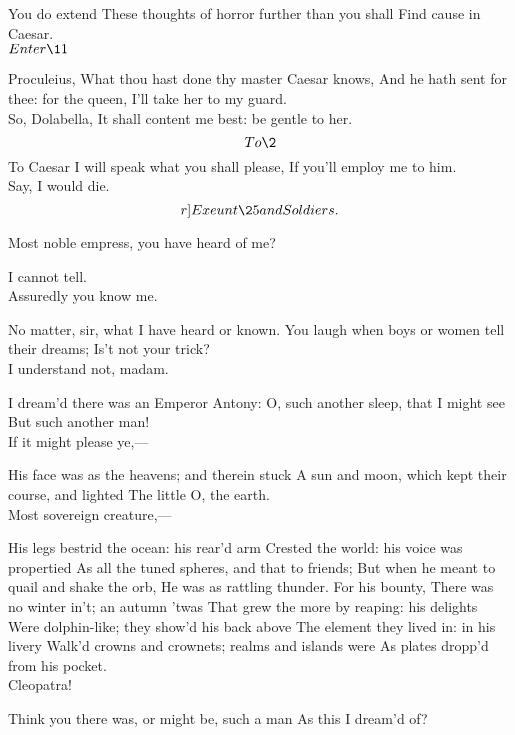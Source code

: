 \documentclass{book}
\begin{document}
	You do extend
	These thoughts of horror further than you shall
	Find cause in Caesar. \\

	\(Enter \11\)

	Proculeius,
	What thou hast done thy master Caesar knows,
	And he hath sent for thee: for the queen,
	I'll take her to my guard. \\

	So, Dolabella,
	It shall content me best: be gentle to her.
	\[To \2\] To Caesar I will speak what you shall please,
	If you'll employ me to him. \\

\2	Say, I would die. 	\[r]Exeunt \25 and Soldiers.\]

	Most noble empress, you have heard of me?

\2	I cannot tell. \\

	                  Assuredly you know me.

\2	No matter, sir, what I have heard or known.
	You laugh when boys or women tell their dreams;
	Is't not your trick? \\

	I understand not, madam.

\2	I dream'd there was an Emperor Antony:
	O, such another sleep, that I might see
	But such another man! \\

	If it might please ye,---

\2	His face was as the heavens; and therein stuck
	A sun and moon, which kept their course, and lighted
	The little O, the earth. \\

	Most sovereign creature,---

\2	His legs bestrid the ocean: his rear'd arm
	Crested the world: his voice was propertied
	As all the tuned spheres, and that to friends;
	But when he meant to quail and shake the orb,
	He was as rattling thunder. For his bounty,
	There was no winter in't; an autumn 'twas
	That grew the more by reaping: his delights
	Were dolphin-like; they show'd his back above
	The element they lived in: in his livery
	Walk'd crowns and crownets; realms and islands were
	As plates dropp'd from his pocket. \\

	Cleopatra!

\2	Think you there was, or might be, such a man
	As this I dream'd of? \\
\end{document}

